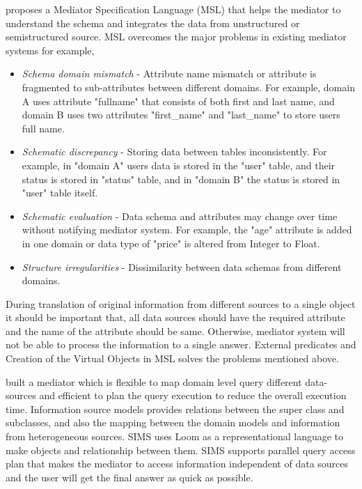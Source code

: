 	\citet{papakonstantinou1996medmaker} proposes a Mediator Specification Language (MSL) that helps the mediator to understand the schema and integrates the data from unstructured or semistructured source. MSL overcomes the major problems in existing mediator systems for example,
	\begin{itemize}
		\item \emph{Schema domain mismatch} - Attribute name mismatch or attribute is fragmented to sub-attributes between different domains. For example, domain A uses attribute "fullname" that consists of both first and last name, and domain B uses two attributes "first\_name" and "last\_name" to store users full name.
		\item \emph{Schematic discrepancy} - Storing data between tables inconsistently. For example, in "domain A" users data is stored in the "user" table, and their status is stored in "status" table, and in "domain B" the status is stored in "user" table itself.
		\item \emph{Schematic evaluation} - Data schema and attributes may change over time without notifying mediator system. For example, the "age" attribute is added in one domain or data type of "price" is altered from Integer to Float.
		\item \emph{Structure irregularities} - Dissimilarity between data schemas from different domains.
	\end{itemize}
	
	During translation of original information from different sources to a single object it should be important that, all data sources should have the required attribute and the name of the attribute should be same. Otherwise, mediator system will not be able to process the information to a single answer.  External predicates and Creation of the Virtual Objects in MSL solves the problems mentioned above.
	
	\citet{arens1996query} built a mediator which is flexible to map domain level query different data-sources and efficient to plan the query execution to reduce the overall execution time. Information source models provides relations between the super class and subclasses, and also the mapping between the domain models and information from heterogeneous sources. SIMS uses Loom as a representational language to make objects and relationship between them. SIMS supports parallel query access plan that makes the mediator to access information independent of data sources and the user will get the final answer as quick as possible.
	
